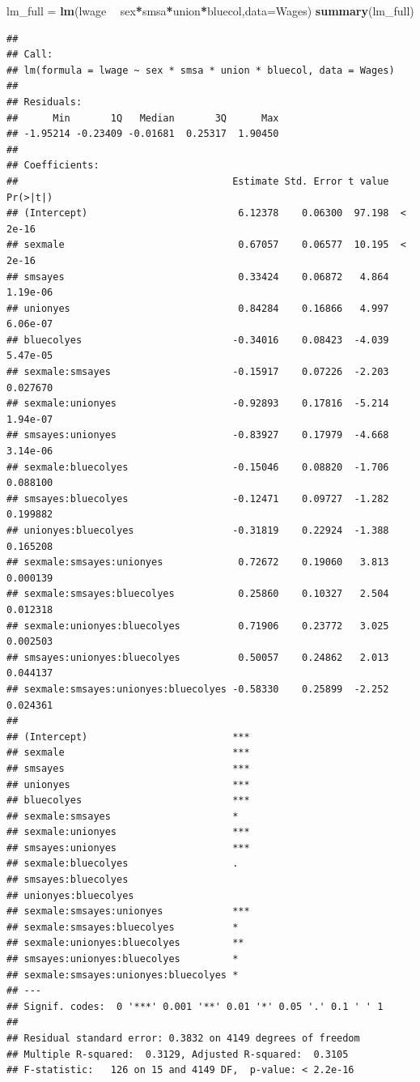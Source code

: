 \documentclass[]{book}
\newenvironment{Shaded}{\begin{snugshade}}{\end{snugshade}}
\newcommand{\KeywordTok}[1]{\textcolor[rgb]{0.13,0.29,0.53}{\textbf{#1}}}
\newcommand{\DataTypeTok}[1]{\textcolor[rgb]{0.13,0.29,0.53}{#1}}
\newcommand{\StringTok}[1]{\textcolor[rgb]{0.31,0.60,0.02}{#1}}
\newcommand{\OperatorTok}[1]{\textcolor[rgb]{0.81,0.36,0.00}{\textbf{#1}}}
\newcommand{\NormalTok}[1]{#1}
\theoremstyle{definition}
\theoremstyle{definition}
\theoremstyle{definition}
\theoremstyle{remark}
\begin{document}
\begin{Shaded}
\begin{Highlighting}[]
\NormalTok{lm_full =}\StringTok{ }\KeywordTok{lm}\NormalTok{(lwage }\OperatorTok{~}\StringTok{ }\NormalTok{sex}\OperatorTok{*}\NormalTok{smsa}\OperatorTok{*}\NormalTok{union}\OperatorTok{*}\NormalTok{bluecol,}\DataTypeTok{data=}\NormalTok{Wages)}
\KeywordTok{summary}\NormalTok{(lm_full)}
\end{Highlighting}
\end{Shaded}

\begin{verbatim}
## 
## Call:
## lm(formula = lwage ~ sex * smsa * union * bluecol, data = Wages)
## 
## Residuals:
##      Min       1Q   Median       3Q      Max 
## -1.95214 -0.23409 -0.01681  0.25317  1.90450 
## 
## Coefficients:
##                                     Estimate Std. Error t value Pr(>|t|)
## (Intercept)                          6.12378    0.06300  97.198  < 2e-16
## sexmale                              0.67057    0.06577  10.195  < 2e-16
## smsayes                              0.33424    0.06872   4.864 1.19e-06
## unionyes                             0.84284    0.16866   4.997 6.06e-07
## bluecolyes                          -0.34016    0.08423  -4.039 5.47e-05
## sexmale:smsayes                     -0.15917    0.07226  -2.203 0.027670
## sexmale:unionyes                    -0.92893    0.17816  -5.214 1.94e-07
## smsayes:unionyes                    -0.83927    0.17979  -4.668 3.14e-06
## sexmale:bluecolyes                  -0.15046    0.08820  -1.706 0.088100
## smsayes:bluecolyes                  -0.12471    0.09727  -1.282 0.199882
## unionyes:bluecolyes                 -0.31819    0.22924  -1.388 0.165208
## sexmale:smsayes:unionyes             0.72672    0.19060   3.813 0.000139
## sexmale:smsayes:bluecolyes           0.25860    0.10327   2.504 0.012318
## sexmale:unionyes:bluecolyes          0.71906    0.23772   3.025 0.002503
## smsayes:unionyes:bluecolyes          0.50057    0.24862   2.013 0.044137
## sexmale:smsayes:unionyes:bluecolyes -0.58330    0.25899  -2.252 0.024361
##                                        
## (Intercept)                         ***
## sexmale                             ***
## smsayes                             ***
## unionyes                            ***
## bluecolyes                          ***
## sexmale:smsayes                     *  
## sexmale:unionyes                    ***
## smsayes:unionyes                    ***
## sexmale:bluecolyes                  .  
## smsayes:bluecolyes                     
## unionyes:bluecolyes                    
## sexmale:smsayes:unionyes            ***
## sexmale:smsayes:bluecolyes          *  
## sexmale:unionyes:bluecolyes         ** 
## smsayes:unionyes:bluecolyes         *  
## sexmale:smsayes:unionyes:bluecolyes *  
## ---
## Signif. codes:  0 '***' 0.001 '**' 0.01 '*' 0.05 '.' 0.1 ' ' 1
## 
## Residual standard error: 0.3832 on 4149 degrees of freedom
## Multiple R-squared:  0.3129, Adjusted R-squared:  0.3105 
## F-statistic:   126 on 15 and 4149 DF,  p-value: < 2.2e-16
\end{verbatim}
\end{document}
